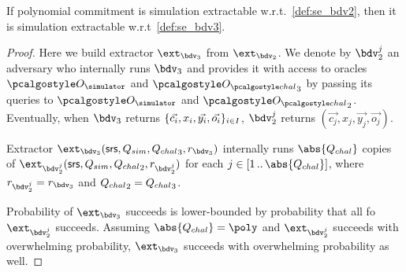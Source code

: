 \documentclass[runningheads,11pt]{llncs}
\let\spvec\vec \let\vec\accentvec
\let\vec\spvec
\begin{document}
\begin{lemma}[]
  If polynomial commitment is simulation extractable w.r.t.~\cref{def:se_bdv2}, then
  it is simulation extractable w.r.t~\cref{def:se_bdv3}.
\end{lemma}
\begin{proof}
  Here we build extractor $\ext_{\bdv_3}$ from $\ext_{\bdv_2}$. We denote by
  $\bdv_2^j$ an adversary who internally runs $\bdv_3$ and provides it with access to
  oracles $\oracles$ and $\oraclec_3$ by passing its queries to $\oracles$ and
  $\oraclec_2$. Eventually, when $\bdv_3$ returns
  $\smallset{\vec{c_i}, x_i, \vec{y_i}, \vec{o_i}}_{i \in I}$, $\bdv_2^j$ returns
  $(\vec{c_j}, x_j, \vec{y_j}, \vec{o_j})$.

  Extractor $\ext_{\bdv_3} (\srs, \Qsim, \Qchal_3, r_{\bdv_3})$ internally runs $\abs{\Qchal}$
  copies of $\ext_{\bdv_2^j}(\srs, \Qsim, \Qchal_2, r_{\bdv_2^j})$ for each $j \in
  \range{1}{\abs{\Qchal}}$, where $r_{\bdv_2^j} = r_{\bdv_3}$ and ${Q_{chal}}_2 =
  {Q_{chal}}_3$.

  Probability of $\ext_{\bdv_3}$ succeeds is lower-bounded by probability that all fo
  $\ext_{\bdv_2^j}$ succeeds. Assuming $\abs{\Qchal} = \poly$ and $\ext_{\bdv_2^j}$
  succeeds with overwhelming probability, $\ext_{\bdv_3}$ succeeds with overwhelming
  probability as well. 
\end{proof}
\end{document}
